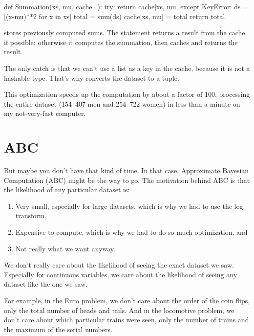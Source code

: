\documentclass[12pt]{book}
\theoremstyle{exercise}
\begin{document}
\begin{code}
def Summation(xs, mu, cache={}):
    try:
        return cache[xs, mu]
    except KeyError:
        ds = [(x-mu)**2 for x in xs]
        total = sum(ds)
        cache[xs, mu] = total
        return total
\end{code}

 stores previously computed sums.  The  statement
returns a result from the cache if possible; otherwise it computes
the summation, then caches and returns the result.

The only catch is that we can't use a list as a key in the cache, because
it is not a hashable type.  That's why  converts
the dataset to a tuple.

This optimization speeds up the computation by about a
factor of 100, processing the entire dataset (154~407 men and 254~722
women) in less than a minute on my not-very-fast computer.


\section{ABC}

But maybe you don't have that kind of time.  In that case, Approximate
Bayesian Computation (ABC) might be the way to go.  The motivation
behind ABC is that the likelihood of any particular dataset is:

\begin{enumerate}

\item Very small, especially for large datasets, which is why we had
to use the log transform,

\item Expensive to compute, which is why we had to do so much
optimization, and

\item Not really what we want anyway.

\end{enumerate}

We don't really care about the likelihood of seeing the exact dataset
we saw.  Especially for continuous variables, we care about the
likelihood of seeing any dataset like the one we saw.

For example, in the Euro problem, we don't care about the order of
the coin flips, only the total number of heads and tails.  And in
the locomotive problem, we don't care about which particular trains were
seen, only the number of trains and the maximum of the serial numbers.
\end{document}
